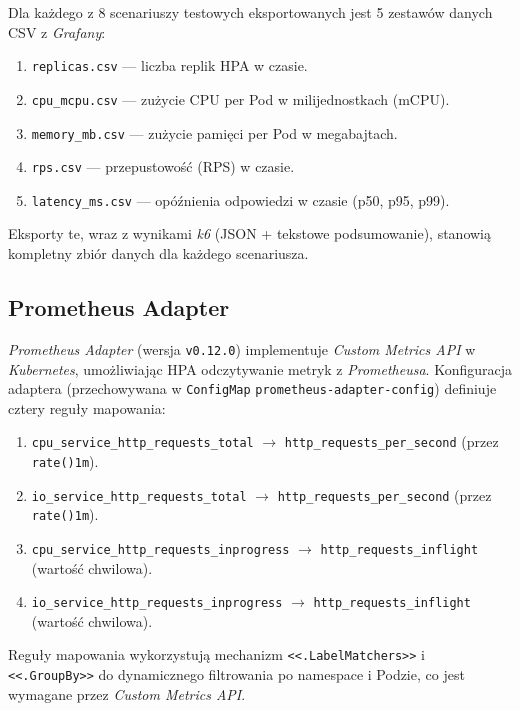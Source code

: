 Dla każdego z 8 scenariuszy testowych eksportowanych jest 5 zestawów danych CSV z \textit{Grafany}:

\begin{enumerate}
  \item \texttt{replicas.csv} — liczba replik HPA w czasie.
  \item \texttt{cpu\_mcpu.csv} — zużycie CPU per Pod w milijednostkach (mCPU).
  \item \texttt{memory\_mb.csv} — zużycie pamięci per Pod w megabajtach.
  \item \texttt{rps.csv} — przepustowość (RPS) w czasie.
  \item \texttt{latency\_ms.csv} — opóźnienia odpowiedzi w czasie (p50, p95, p99).
\end{enumerate}

Eksporty te, wraz z wynikami \textit{k6} (JSON + tekstowe podsumowanie), stanowią kompletny zbiór danych dla każdego scenariusza.

\subsection{Prometheus Adapter}

\textit{Prometheus Adapter} (wersja \texttt{v0.12.0}) implementuje \textit{Custom Metrics API} w \textit{Kubernetes}, umożliwiając HPA odczytywanie metryk z \textit{Prometheusa}. Konfiguracja adaptera (przechowywana w \texttt{ConfigMap} \texttt{prometheus-adapter-config}) definiuje cztery reguły mapowania:

\begin{enumerate}
  \item \texttt{cpu\_service\_http\_requests\_total} $\rightarrow$ \texttt{http\_requests\_per\_second} (przez \texttt{rate()\lbrack{}1m\rbrack{}}).
  \item \texttt{io\_service\_http\_requests\_total} $\rightarrow$ \texttt{http\_requests\_per\_second} (przez \texttt{rate()\lbrack{}1m\rbrack{}}).
  \item \texttt{cpu\_service\_http\_requests\_inprogress} $\rightarrow$ \texttt{http\_requests\_inflight} (wartość chwilowa).
  \item \texttt{io\_service\_http\_requests\_inprogress} $\rightarrow$ \texttt{http\_requests\_inflight} (wartość chwilowa).
\end{enumerate}

Reguły mapowania wykorzystują mechanizm \texttt{<<.LabelMatchers>>} i \texttt{<<.GroupBy>>} do dynamicznego filtrowania po namespace i Podzie, co jest wymagane przez \textit{Custom Metrics API}.

